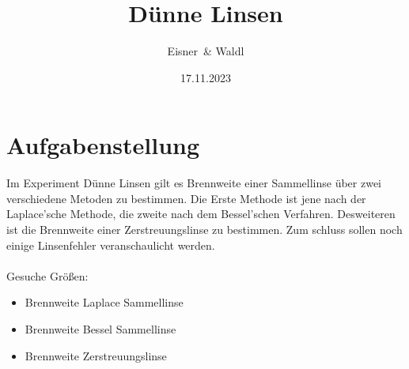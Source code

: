 \documentclass[12pt,a4paper,twoside]{article}
\begin{document}
\newcommand\laboratorynumber{2}
\title{Dünne Linsen}
\newcommand\supervisor{Ditlbacher, Harald}
\newcommand\groupnumber{42}

\newcommand\participantonelastname{Eisner}
\newcommand\participantonefirstname{Nico}
\newcommand\participantoneid{12214121}
\newcommand\participanttwolastname{Waldl}
\newcommand\participanttwofirstname{Philip}
\newcommand\participanttwoid{12214120}
\author{\participantonelastname \ \& \participanttwolastname}

\newcommand\degreeid{UB 033 678}
\newcommand\semester{23WS}
\date{17.11.2023}

\newcommand\coursetitle{Laborübungen 2: \\ Elektrizität, Magnetismus, Optik}

%



\tableofcontents
\newpage

\section{Aufgabenstellung} %
Im Experiment Dünne Linsen gilt es Brennweite einer Sammellinse über zwei verschiedene Metoden zu bestimmen. 
Die Erste Methode ist jene nach der Laplace'sche Methode, die zweite nach dem Bessel'schen Verfahren. 
Desweiteren ist die Brennweite einer Zerstreuungslinse zu bestimmen. 
Zum schluss sollen noch einige Linsenfehler veranschaulicht werden. 
\\
\\
Gesuche Größen: 
\begin{itemize}
    \item Brennweite Laplace Sammellinse
    \item Brennweite Bessel Sammellinse
    \item Brennweite Zerstreuungslinse
\end{itemize}
\end{document}
